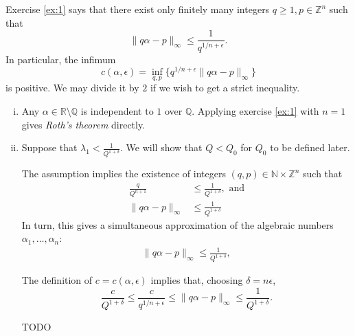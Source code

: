 \documentclass[12pt,a4paper]{article}
\theoremstyle{plain}
\theoremstyle{definition}
\def \N {\mathbb N}
\def \Q {\mathbb Q}
\def \R {\mathbb R}
\def \Z {\mathbb Z}
\begin{document}
{
	Exercise \ref{ex:1} says that there exist only finitely many integers $q \geq1, p\in\Z^n$ such that
		\[ \|q \alpha - p \|_\infty \leq \frac{1}{q^{1/n + \epsilon}}. \]
	In particular, the infimum
		\[ c(\alpha, \epsilon) = \inf_{q, p} \{  q^{1/n + \epsilon} \|q \alpha - p \|_\infty \} \]
	is positive.
	We may divide it by $2$ if we wish to get a strict inequality.

	\begin{enumerate}[i)]
		\item 
		Any $\alpha \in \R \setminus\Q$ is independent to $1$ over $\Q$.
		Applying exercise \ref{ex:1} with $n=1$ gives \emph{Roth's theorem} directly.

		\item
		Suppose that
			$ \lambda_1 < \frac{1}{Q^{1+\delta}} .$
		We will show that $Q < Q_0$ for $Q_0$ to be defined later.
	
		The assumption implies the existence of integers $(q, p) \in \N \times \Z^n$ such that
		\begin{align*}
			\frac{q}{Q^{n+1}} &\leq \frac{1}{Q^{1+\delta}}, \text{ and} \\
			\| q \alpha - p \|_\infty &\leq \frac{1}{Q^{1+\delta}}
		\end{align*}
		In turn, this gives a simultaneous approximation of the algebraic numbers $\alpha_1, \dots, \alpha_n$:
		\begin{align*}
			\| q \alpha - p \|_\infty \leq \frac{1}{Q^{1+\delta}},
		\end{align*}

		The definition of $c=c(\alpha, \epsilon)$ implies that, choosing $\delta = n \epsilon$,
			\[  \frac{c}{Q^{1 + \delta}} \leq \frac{c}{q^{1/n + \epsilon}} \leq  \| q \alpha - p \|_\infty \leq \frac{1}{Q^{1+\delta}}. \]

TODO
	\end{enumerate}
}
\end{document}
